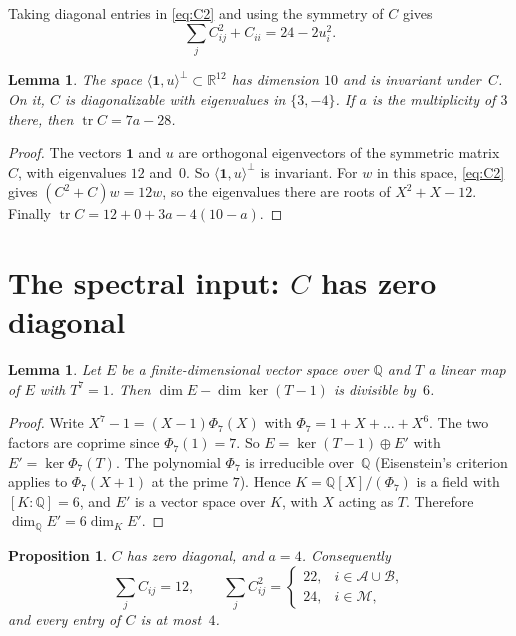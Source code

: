 \documentclass[11pt,a4paper]{amsart}
\newtheorem{proposition}[theorem]{Proposition}
\newtheorem{lemma}[theorem]{Lemma}
\theoremstyle{definition}
\theoremstyle{remark}
\newcommand{\Q}{\mathbb{Q}}
\newcommand{\R}{\mathbb{R}}
\newcommand{\one}{\mathbf{1}}
\newcommand{\cA}{\mathcal{A}}
\newcommand{\cB}{\mathcal{B}}
\newcommand{\cM}{\mathcal{M}}
\newcommand{\tr}{\operatorname{tr}}
\begin{document}
Taking diagonal entries in \eqref{eq:C2} and using the symmetry of $C$ gives
\begin{equation}\label{eq:diag}
\sum_j C_{ij}^2+C_{ii}=24-2u_i^2 .
\end{equation}

\begin{lemma}\label{lem:specC}
The space $\langle\one,u\rangle^\perp\subset\R^{12}$ has dimension $10$ and is invariant under~$C$. On it,
$C$ is diagonalizable with eigenvalues in $\{3,-4\}$. If $a$ is the multiplicity of $3$ there, then
$\tr C=7a-28$.
\end{lemma}

\begin{proof}
The vectors $\one$ and $u$ are orthogonal eigenvectors of the symmetric matrix $C$, with eigenvalues $12$
and~$0$. So $\langle\one,u\rangle^\perp$ is invariant. For $w$ in this space, \eqref{eq:C2} gives
$(C^2+C)w=12w$, so the eigenvalues there are roots of $X^2+X-12$. Finally $\tr C=12+0+3a-4(10-a)$.
\end{proof}

\section{The spectral input: \texorpdfstring{$C$}{C} has zero diagonal}\label{sec:spectral}

\begin{lemma}\label{lem:rational}
Let $E$ be a finite-dimensional vector space over $\Q$ and $T$ a linear map of $E$ with $T^7=1$. Then
$\dim E-\dim\ker(T-1)$ is divisible by~$6$.
\end{lemma}

\begin{proof}
Write $X^7-1=(X-1)\Phi_7(X)$ with $\Phi_7=1+X+\dots+X^6$. The two factors are coprime since $\Phi_7(1)=7$.
So $E=\ker(T-1)\oplus E'$ with $E'=\ker\Phi_7(T)$. The polynomial $\Phi_7$ is irreducible over~$\Q$
(Eisenstein's criterion applies to $\Phi_7(X+1)$ at the prime $7$). Hence $K=\Q[X]/(\Phi_7)$ is a field
with $[K:\Q]=6$, and $E'$ is a vector space over $K$, with $X$ acting as $T$. Therefore
$\dim_\Q E'=6\dim_K E'$.
\end{proof}

\begin{proposition}\label{prop:zerodiag}
$C$ has zero diagonal, and $a=4$. Consequently
\begin{equation}\label{eq:rows}
\sum_j C_{ij}=12,\qquad \sum_j C_{ij}^2=\begin{cases}22,& i\in\cA\cup\cB,\\ 24,& i\in\cM,\end{cases}
\end{equation}
and every entry of $C$ is at most~$4$.
\end{proposition}
\end{document}
